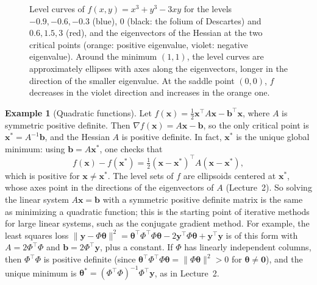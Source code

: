 \documentclass[11pt]{article}
\newcommand{\norm}[1]{\lVert #1 \rVert}
\theoremstyle{definition}
\newtheorem{example}[definition]{Example}
\theoremstyle{plain}
\theoremstyle{remark}
\begin{document}
\begin{figure}[ht]
    \caption{Level curves of $f(x, y) = x^3 + y^3 - 3xy$ for the levels $-0.9, -0.6, -0.3$ (blue), $0$ (black: the folium of Descartes) and $0.6, 1.5, 3$ (red), and the eigenvectors of the Hessian at the two critical points (orange: positive eigenvalue, violet: negative eigenvalue). Around the minimum $(1, 1)$, the level curves are approximately ellipses with axes along the eigenvectors, longer in the direction of the smaller eigenvalue. At the saddle point $(0, 0)$, $f$ decreases in the violet direction and increases in the orange one.}
    \label{fig:critical-points}
\end{figure}

\begin{example}[Quadratic functions]\label{ex:quadratic-min}
    Let $f(\mathbf{x}) = \frac{1}{2}\mathbf{x}^\top A\mathbf{x} - \mathbf{b}^\top\mathbf{x}$, where $A$ is symmetric positive definite. Then $\nabla f(\mathbf{x}) = A\mathbf{x} - \mathbf{b}$, so the only critical point is $\mathbf{x}^* = A^{-1}\mathbf{b}$, and the Hessian $A$ is positive definite. In fact, $\mathbf{x}^*$ is the unique global minimum: using $\mathbf{b} = A\mathbf{x}^*$, one checks that
    \[f(\mathbf{x}) - f(\mathbf{x}^*) = \tfrac{1}{2}(\mathbf{x} - \mathbf{x}^*)^\top A(\mathbf{x} - \mathbf{x}^*),\]
    which is positive for $\mathbf{x} \neq \mathbf{x}^*$. The level sets of $f$ are ellipsoids centered at $\mathbf{x}^*$, whose axes point in the directions of the eigenvectors of $A$ (Lecture~2). So solving the linear system $A\mathbf{x} = \mathbf{b}$ with a symmetric positive definite matrix is the same as minimizing a quadratic function; this is the starting point of iterative methods for large linear systems, such as the conjugate gradient method. For example, the least squares loss $\norm{\mathbf{y} - \Phi\boldsymbol{\theta}}^2 = \boldsymbol{\theta}^\top\Phi^\top\Phi\boldsymbol{\theta} - 2\mathbf{y}^\top\Phi\boldsymbol{\theta} + \mathbf{y}^\top\mathbf{y}$ is of this form with $A = 2\Phi^\top\Phi$ and $\mathbf{b} = 2\Phi^\top\mathbf{y}$, plus a constant. If $\Phi$ has linearly independent columns, then $\Phi^\top\Phi$ is positive definite (since $\boldsymbol{\theta}^\top\Phi^\top\Phi\boldsymbol{\theta} = \norm{\Phi\boldsymbol{\theta}}^2 > 0$ for $\boldsymbol{\theta} \neq \mathbf{0}$), and the unique minimum is $\boldsymbol{\theta}^* = (\Phi^\top\Phi)^{-1}\Phi^\top\mathbf{y}$, as in Lecture~2.
\end{example}
\end{document}

